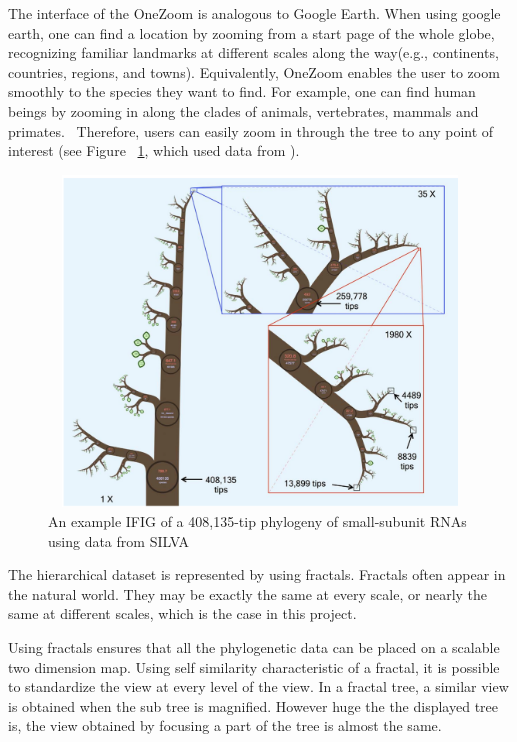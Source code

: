 \documentclass[a4paper,11pt,twoside]{report}
\begin{document}
The interface of the OneZoom is analogous to Google Earth. When using google earth, one can find a location by zooming from a start page of the whole globe, recognizing familiar landmarks at different scales along the way(e.g., continents, countries, regions, and towns).\cite{oneZoom} Equivalently, OneZoom enables the user to zoom smoothly to the species they want to find. For example, one can find human beings by zooming in along the clades of animals, vertebrates, mammals and primates.~\cite{oneZoom} Therefore, users can easily zoom in through the tree to any point of interest (see Figure ~\ref{fig:oneZoomExample}, which used data from \cite{dataForOneZoom}).

\begin{figure}[H]
  \centering
  \includegraphics [width=15cm,height=8.8cm]{oneZoomExample}
  \caption{An example IFIG of a 408,135-tip phylogeny of small-subunit RNAs using data from SILVA}
  \label{fig:oneZoomExample}
\end{figure}

The hierarchical dataset is represented by using fractals. Fractals often appear in the natural world.\cite{fractal1}\cite{fractal2} They may be exactly the same at every scale, or nearly the same at different scales,\cite{fractalWiki1}\cite{fractalWiki2}\cite{fractalWiki3}\cite{fractalWiki4}  which is the case in this project. 

Using fractals ensures that all the phylogenetic data can be placed on a scalable two dimension map. 
Using self similarity characteristic of a fractal, it is possible to standardize the view at every level of the view. In a fractal tree, a similar view is obtained when the sub tree is magnified. However huge the the displayed tree is, the view obtained by focusing a part of the tree is almost the same.\cite{fractalMath}
\end{document}
